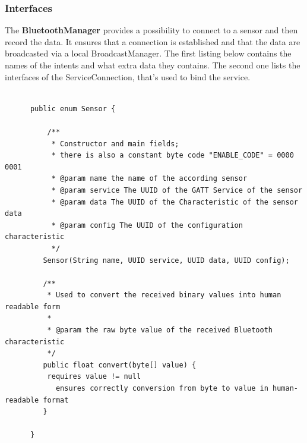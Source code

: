 \subsubsection{Interfaces}
    The \textbf{BluetoothManager} provides a possibility to connect to a sensor and then record
    the data. It ensures that a connection is established and that the data are broadcasted via a local BroadcastManager. The first listing below contains the names of the intents and what extra data they contains. The second one lists the interfaces of the ServiceConnection, that's used to bind the service. \\
    \begin{lstlisting}

      public enum Sensor {

          /**
           * Constructor and main fields;
           * there is also a constant byte code "ENABLE_CODE" = 0000 0001
           * @param name the name of the according sensor
           * @param service The UUID of the GATT Service of the sensor
           * @param data The UUID of the Characteristic of the sensor data
           * @param config The UUID of the configuration characteristic
           */
         Sensor(String name, UUID service, UUID data, UUID config);

         /**
          * Used to convert the received binary values into human readable form
          *
          * @param the raw byte value of the received Bluetooth characteristic
          */
         public float convert(byte[] value) {
          requires value != null
            ensures correctly conversion from byte to value in human-readable format
         }

      }
    \end{lstlisting}
